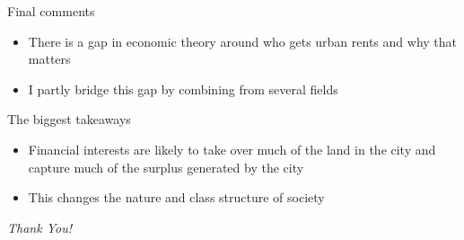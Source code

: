 \documentclass[]{beamer} %
\begin{document}
\begin{frame}{Final comments}
 \begin{itemize} \Large
\item There is a gap in economic theory around who gets urban rents and why that matters
\item I partly bridge this gap by combining from several  fields

\end{itemize}
\end{frame}
\begin{frame}{The biggest takeaways} 
\Large
\begin{itemize}[<+-|alert@+>]
    \item Financial interests are likely to take over much of the land in the city and capture much of the surplus generated by the city
    \item This changes the nature and class structure of society
\end{itemize}
\end{frame}
\begin{frame}
  \centering \Huge

  \emph{Thank You!}
\end{frame}
\end{document}
